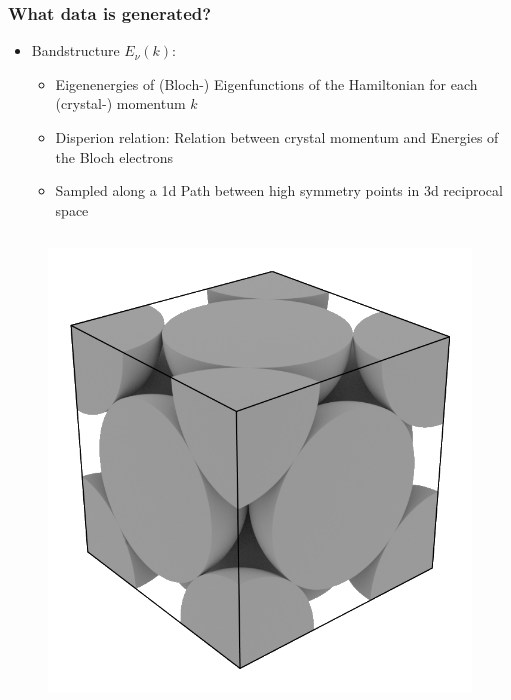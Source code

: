 \begin{frame}\frametitle{What data is generated?}
\begin{itemize}
    

\item Bandstructure $E_{\nu}(k)$:
\begin{itemize}
    \item Eigenenergies of (Bloch-) Eigenfunctions of the Hamiltonian for each (crystal-) momentum $k$
    \item Disperion relation: Relation between crystal momentum and Energies of the Bloch electrons
    \item Sampled along a 1d Path between high symmetry points in 3d reciprocal space 
\end{itemize}
\end{itemize}

\begin{column}{.5\textwidth}
\begin{figure}
   \includegraphics[width=0.7\linewidth]{fig/fcc_real.png}
\end{figure}


\end{column}
\end{frame}
